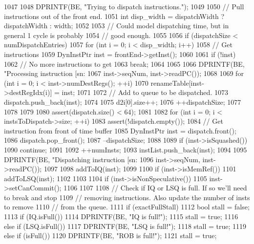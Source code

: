 \begin{DoxyCode}
1047 {
1048     DPRINTF(BE, "Trying to dispatch instructions.\n");
1049 
1050     // Pull instructions out of the front end.
1051     int disp_width = dispatchWidth ? dispatchWidth : width;
1052 
1053     // Could model dispatching time, but in general 1 cycle is probably
1054     // good enough.
1055 
1056     if (dispatchSize < numDispatchEntries) {
1057         for (int i = 0; i < disp_width; i++) {
1058             // Get instructions
1059             DynInstPtr inst = frontEnd->getInst();
1060 
1061             if (!inst) {
1062                 // No more instructions to get
1063                 break;
1064             }
1065 
1066             DPRINTF(BE, "Processing instruction [sn:%
1067                     inst->seqNum, inst->readPC());
1068 
1069             for (int i = 0; i < inst->numDestRegs(); ++i)
1070                 renameTable[inst->destRegIdx(i)] = inst;
1071 
1072             // Add to queue to be dispatched.
1073             dispatch.push_back(inst);
1074 
1075             d2i[0].size++;
1076             ++dispatchSize;
1077         }
1078     }
1079 
1080     assert(dispatch.size() < 64);
1081 
1082     for (int i = 0; i < instsToDispatch->size; ++i) {
1083         assert(!dispatch.empty());
1084         // Get instruction from front of time buffer
1085         DynInstPtr inst = dispatch.front();
1086         dispatch.pop_front();
1087         --dispatchSize;
1088 
1089         if (inst->isSquashed())
1090             continue;
1091 
1092         ++numInsts;
1093         instList.push_back(inst);
1094 
1095         DPRINTF(BE, "Dispatching instruction [sn:%
1096                 inst->seqNum, inst->readPC());
1097 
1098         addToIQ(inst);
1099 
1100         if (inst->isMemRef()) {
1101             addToLSQ(inst);
1102         }
1103 
1104         if (inst->isNonSpeculative()) {
1105             inst->setCanCommit();
1106         }
1107 
1108         // Check if IQ or LSQ is full.  If so we'll need to break and stop
1109         // removing instructions.  Also update the number of insts to remove
1110         // from the queue.
1111         if (exactFullStall) {
1112             bool stall = false;
1113             if (IQ.isFull()) {
1114                 DPRINTF(BE, "IQ is full!\n");
1115                 stall = true;
1116             } else if (LSQ.isFull()) {
1117                 DPRINTF(BE, "LSQ is full!\n");
1118                 stall = true;
1119             } else if (isFull()) {
1120                 DPRINTF(BE, "ROB is full!\n");
1121                 stall = true;
}}}}
\end{DoxyCode}
